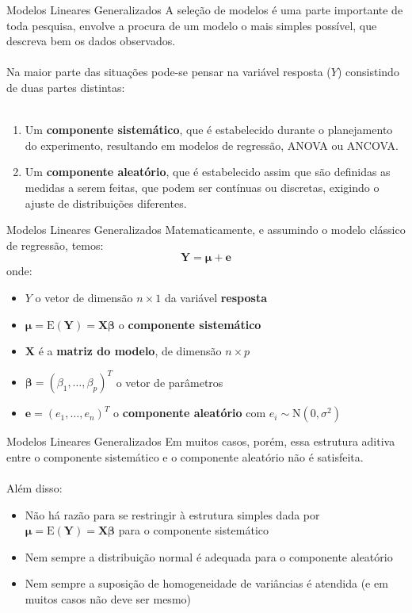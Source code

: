 \documentclass[10pt]{beamer}\usepackage[]{graphicx}\usepackage[]{color}
\newcommand{\mb}[1]{\mathbf{#1}}
\newcommand{\bs}[1]{\boldsymbol{#1}}
\providecommand{\E}{\text{E}}
\theoremstyle{definition}
\begin{document}
\begin{frame}[fragile]{Modelos Lineares Generalizados}
  A seleção de modelos é uma parte importante de toda pesquisa, envolve
  a procura de um modelo o mais simples possível, que descreva
  bem os dados observados. \\~\\
  Na maior parte das situações pode-se pensar na variável resposta ($Y$)
  consistindo de duas partes distintas: \\~\\
  \begin{enumerate}
  \item Um \textbf{componente sistemático}, que é estabelecido durante o
    planejamento do experimento, resultando em modelos de regressão,
    ANOVA ou ANCOVA.
  \item Um \textbf{componente aleatório}, que é estabelecido assim
  que são definidas as medidas a serem feitas, que podem ser contínuas
  ou discretas, exigindo o ajuste de distribuições diferentes.
\end{enumerate}
\end{frame}

\begin{frame}[fragile]{Modelos Lineares Generalizados}
  Matematicamente, e assumindo o modelo clássico de regressão, temos:
  \begin{equation*}
    \mb{Y} = \bs{\mu} + \mb{e}
  \end{equation*}
  onde:
  \begin{itemize}
  \item $Y$ o vetor de dimensão $n \times 1$ da variável
    \textbf{resposta}
  \item $\bs{\mu} = \E(\mb{Y}) = \mb{X}\bs{\beta}$ o \textbf{componente
    sistemático}
  \item $\mb{X}$ é a \textbf{matriz do modelo}, de dimensão $n \times p$
  \item $\bs{\beta} = (\beta_1, \ldots, \beta_p)^{T}$ o vetor de
    parâmetros
  \item $\mb{e} = (e_1, \ldots, e_n)^{T}$ o \textbf{componente
      aleatório} com $e_i \sim \text{N}(0, \sigma^2)$
  \end{itemize}
\end{frame}

\begin{frame}[fragile]{Modelos Lineares Generalizados}
  Em muitos casos, porém, essa estrutura aditiva entre o componente
  sistemático e o componente aleatório não é satisfeita. \\~\\
  Além disso:
  \begin{itemize}
  \item Não há razão para se restringir à estrutura simples dada por
    $\bs{\mu} = \E(\mb{Y}) = \mb{X}\bs{\beta}$ para o componente
    sistemático
  \item Nem sempre a distribuição normal é adequada para o componente
    aleatório
  \item Nem sempre a suposição de homogeneidade de variâncias é atendida
    (e em muitos casos não deve ser mesmo)
  \end{itemize}
\end{frame}
\end{document}
